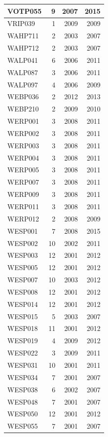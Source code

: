 \documentclass[11pt,]{book}
\begin{document}
\begin{table}
\begin{tabular}[t]{l|r|r|r}
\hline
VOTP055 & 9 & 2007 & 2015\\
\hline
VRIP039 & 1 & 2009 & 2009\\
\hline
WAHP711 & 2 & 2003 & 2007\\
\hline
WAHP712 & 2 & 2003 & 2007\\
\hline
WALP041 & 6 & 2006 & 2011\\
\hline
WALP087 & 3 & 2006 & 2011\\
\hline
WALP097 & 4 & 2006 & 2009\\
\hline
WEBP036 & 2 & 2012 & 2013\\
\hline
WEBP210 & 2 & 2009 & 2010\\
\hline
WERP001 & 3 & 2008 & 2011\\
\hline
WERP002 & 3 & 2008 & 2011\\
\hline
WERP003 & 3 & 2008 & 2011\\
\hline
WERP004 & 3 & 2008 & 2011\\
\hline
WERP005 & 3 & 2008 & 2011\\
\hline
WERP007 & 3 & 2008 & 2011\\
\hline
WERP009 & 3 & 2008 & 2011\\
\hline
WERP011 & 3 & 2008 & 2011\\
\hline
WERP012 & 2 & 2008 & 2009\\
\hline
WESP001 & 7 & 2008 & 2015\\
\hline
WESP002 & 10 & 2002 & 2011\\
\hline
WESP003 & 12 & 2001 & 2012\\
\hline
WESP005 & 12 & 2001 & 2012\\
\hline
WESP007 & 10 & 2003 & 2012\\
\hline
WESP008 & 12 & 2001 & 2012\\
\hline
WESP014 & 12 & 2001 & 2012\\
\hline
WESP015 & 5 & 2003 & 2007\\
\hline
WESP018 & 11 & 2001 & 2012\\
\hline
WESP019 & 4 & 2009 & 2012\\
\hline
WESP022 & 3 & 2009 & 2011\\
\hline
WESP031 & 10 & 2001 & 2011\\
\hline
WESP034 & 7 & 2001 & 2007\\
\hline
WESP038 & 6 & 2002 & 2007\\
\hline
WESP048 & 7 & 2001 & 2007\\
\hline
WESP050 & 12 & 2001 & 2012\\
\hline
WESP055 & 7 & 2001 & 2007\\

\end{tabular}
\end{table}
\end{document}
